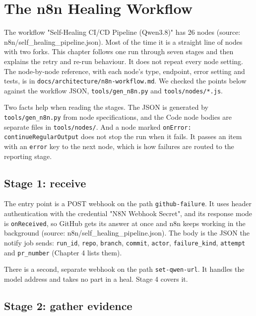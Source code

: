 \documentclass[11pt,a4paper]{report}
\begin{document}
\chapter{The n8n Healing Workflow}

The workflow "Self-Healing CI/CD Pipeline (Qwen3.8)" has 26 nodes (source: n8n/self\_healing\_pipeline.json). Most of the time it is a straight line of nodes with two forks. This chapter follows one run through seven stages and then explains the retry and re-run behaviour. It does not repeat every node setting. The node-by-node reference, with each node's type, endpoint, error setting and tests, is in \texttt{docs/\allowbreak{}architecture/\allowbreak{}n8n-\allowbreak{}workflow.\allowbreak{}md}. We checked the points below against the workflow JSON, \texttt{tools/\allowbreak{}gen\_\allowbreak{}n8n.\allowbreak{}py} and \texttt{tools/\allowbreak{}nodes/\allowbreak{}*.\allowbreak{}js}.

Two facts help when reading the stages. The JSON is generated by \texttt{tools/\allowbreak{}gen\_\allowbreak{}n8n.\allowbreak{}py} from node specifications, and the Code node bodies are separate files in \texttt{tools/\allowbreak{}nodes/\allowbreak{}}. And a node marked \texttt{onError: continueRegularOutput} does not stop the run when it fails. It passes an item with an \texttt{error} key to the next node, which is how failures are routed to the reporting stage.

\section{Stage 1: receive}

The entry point is a POST webhook on the path \texttt{github-\allowbreak{}failure}. It uses header authentication with the credential "N8N Webhook Secret", and its response mode is \texttt{onReceived}, so GitHub gets its answer at once and n8n keeps working in the background (source: n8n/self\_healing\_pipeline.json). The body is the JSON the notify job sends: \texttt{run\_\allowbreak{}id}, \texttt{repo}, \texttt{branch}, \texttt{commit}, \texttt{actor}, \texttt{failure\_\allowbreak{}kind}, \texttt{attempt} and \texttt{pr\_\allowbreak{}number} (Chapter 4 lists them).

There is a second, separate webhook on the path \texttt{set-\allowbreak{}qwen-\allowbreak{}url}. It handles the model address and takes no part in a heal. Stage 4 covers it.

\section{Stage 2: gather evidence}
\end{document}
